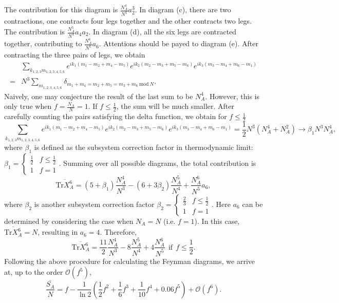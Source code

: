 \documentclass[aps,onecolumn,nofootinbib,superscriptaddress,notitlepage,longbibliography]{revtex4-1}
\def \Tr {\mathrm{Tr}}
\begin{document}
The contribution for this diagram is $\frac{N_{A}^{4}}{N^{3}}a_{2}^{3}$.
In diagram (c), there are two contractions, one contracts four legs
together and the other contracts two legs. The contribution is $\frac{N_{A}^{5}}{N^{4}}a_{4}a_{2}$.
In diagram (d), all the six legs are contracted together, contributing
to $\frac{N_{A}^{6}}{N^{5}}a_{6}$. Attentions should be payed to %
diagram (e). After contracting the three pairs of legs, we obtain
\begin{equation}
\begin{split} & \sum_{k_{1,2,3}m_{1,2,3,4,5,6}}e^{ik_{1}(m_{1}-m_{2}+m_{4}-m_{5})}e^{ik_{2}(m_{2}-m_{3}+m_{5}-m_{6})}e^{ik_{3}(m_{3}-m_{4}+m_{6}-m_{1})}\\
= & N^{3}\sum_{m_{1,2,3,4,5,6}}\delta_{m_{1}+m_{4}=m_{2}+m_{5}=m_{3}+m_{6}\ \mathrm{mod\ }N}.
\end{split}
\end{equation}
Naively, one may conjecture %
the result of the last sum to %
be $N_{A}^{4}$.
However, this is only true when $f=\frac{N_{A}}{N}=1$. If $f\leq\frac{1}{2}$,
the sum will be much smaller. After carefully counting the pairs satisfying
the delta function, we obtain for $f\leq\frac{1}{2}$
\begin{equation}
\sum_{k_{1,2,3}m_{1,2,3,4,5,6}}e^{ik_{1}(m_{1}-m_{2}+m_{4}-m_{5})}e^{ik_{2}(m_{2}-m_{3}+m_{5}-m_{6})}e^{ik_{3}(m_{3}-m_{4}+m_{6}-m_{1})}=\frac{1}{2}N^{3}(N_{A}^{4}+N_{A}^{2})\to\beta_{1}N^{3}N_{A}^{4},
\end{equation}
where $\beta_{1}$ is defined as the subsystem correction factor in
thermodynamic limit: $\beta_{1}=\begin{cases}
\frac{1}{2} & f\leq\frac{1}{2}\\
1 & f=1
\end{cases}$. Summing over all possible diagrams, the total contribution is 
\begin{equation}
\overline{\Tr X_{A}^{6}}=(5+\beta_{1})\frac{N_{A}^{4}}{N^{3}}-(6+3\beta_{2})\frac{N_{A}^{5}}{N^{4}}+\frac{N_{A}^{6}}{N^{5}}a_{6},
\end{equation}
where $\beta_{2}$ is another subsystem correction factor $\beta_{2}=\begin{cases}
\frac{2}{3} & f\leq\frac{1}{2}\\
1 & f=1
\end{cases}$. Here $a_{6}$ can be determined by considering the case when $N_{A}=N$
(i.e. $f=1$). In this case, $\overline{\Tr X_{A}^{6}}=N$, resulting
in $a_{6}=4$. Therefore, 
\begin{equation}
\overline{\Tr X_{A}^{6}}=\frac{11}{2}\frac{N_{A}^{4}}{N^{3}}-8\frac{N_{A}^{5}}{N^{4}}+4\frac{N_{A}^{6}}{N^{5}}\ \ \mathrm{if}\ \ f\leq\frac{1}{2}.
\end{equation}
Following the above procedure for calculating the Feynman diagrams, we arrive at, up to the order $\mathcal{O}(f^5)$,
\begin{equation}
\frac{\overline{S_{A}}}{N}=f-\frac{1}{\ln{2}}\left(\frac{1}{2}f^{2}+\frac{1}{6}f^{3}+\frac{1}{10}f^{4}+0.06f^{5}\right)+\mathcal{O}(f^{6}).
\end{equation}
\end{document}
